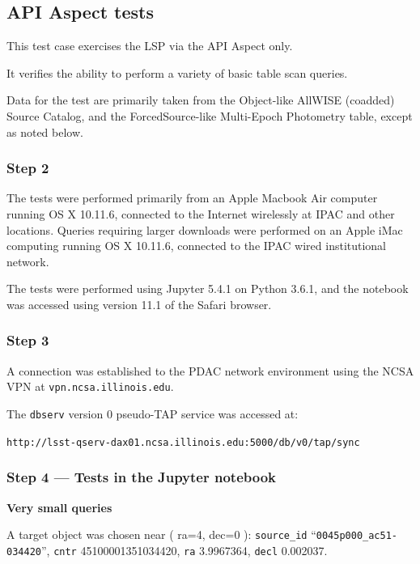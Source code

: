 
\subsection{API Aspect tests}

This test case exercises the LSP via the API Aspect only.

It verifies the ability to perform a variety of basic table scan queries.

Data for the test are primarily taken from the Object-like AllWISE (coadded) Source Catalog,
and the ForcedSource-like Multi-Epoch Photometry table,
except as noted below.

\subsubsection{Step 2}

The tests were performed primarily from an Apple Macbook Air computer running OS X 10.11.6,
connected to the Internet wirelessly at IPAC and other locations.
Queries requiring larger downloads were performed on an Apple iMac computing running OS X 10.11.6,
connected to the IPAC wired institutional network.

The tests were performed using Jupyter 5.4.1 on Python 3.6.1, and the notebook was accessed using version 11.1 of the Safari browser.

\subsubsection{Step 3}

A connection was established to the PDAC network environment using the NCSA VPN at \texttt{vpn.ncsa.illinois.edu}.

The \verb|dbserv| version 0 pseudo-TAP service was accessed at:

\begin{center}
\texttt{http://lsst-qserv-dax01.ncsa.illinois.edu:5000/db/v0/tap/sync}
\end{center}

\subsubsection{Step 4 --- Tests in the Jupyter notebook}

\textbf{Very small queries}

A target object was chosen near ( ra=4, dec=0 ):
\verb|source_id| ``\verb|0045p000_ac51-034420|'', \verb|cntr| 45100001351034420, \verb|ra| 3.9967364, \verb|decl| 0.002037.

